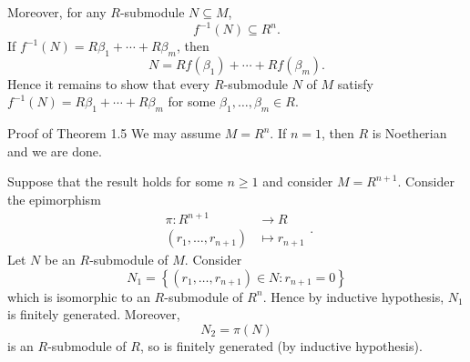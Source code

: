 \documentclass[pmath441]{subfiles}
\begin{document}
    Moreover, for any $R$-submodule $N\subseteq M$,
    \begin{equation*}
        f^{-1}\left( N \right)\subseteq R^n.
    \end{equation*}
    If $f^{-1}\left( N \right) = R\beta_1 + \cdots + R\beta_m$, then
    \begin{equation*}
        N = Rf\left( \beta_1 \right) + \cdots + Rf\left( \beta_m \right).
    \end{equation*}
    Hence it remains to show that every $R$-submodule $N$ of $M$ satisfy $f^{-1}\left( N \right) = R\beta_1+\cdots+R\beta_m$ for some $\beta_1,\ldots,\beta_m\in R$.

    \begin{boxyproof}{Proof of Theorem 1.5}
        We may assume $M=R^n$. If $n=1$, then $R$ is Noetherian and we are done.

        Suppose that the result holds for some $n\geq 1$ and consider $M = R^{n+1}$. Consider the epimorphism
        \begin{equation*}
            \begin{aligned}
                \pi:R^{n+1}&\to R \\
                \left( r_1,\ldots,r_{n+1} \right) & \mapsto r_{n+1}
            \end{aligned} .
        \end{equation*}
        Let $N$ be an $R$-submodule of $M$. Consider
        \begin{equation*}
            N_1 = \left\lbrace \left( r_1,\ldots,r_{n+1} \right)\in N: r_{n+1} = 0 \right\rbrace
        \end{equation*}
        which is isomorphic to an $R$-submodule of $R^n$. Hence by inductive hypothesis, $N_1$ is finitely generated. Moreover,
        \begin{equation*}
            N_2 = \pi\left( N \right)
        \end{equation*}
        is an $R$-submodule of $R$, so is finitely generated (by inductive hypothesis).


\end{boxyproof}
\end{document}
